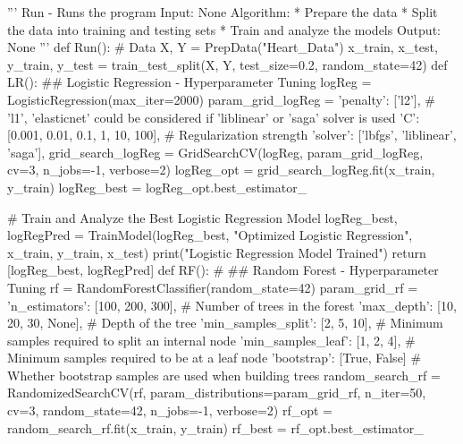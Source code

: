 {\begin{highlight}[Assets]
    \begin{code}[Python]
    ''' Run - Runs the program
            Input:
                None
            Algorithm:
                * Prepare the data
                * Split the data into training and testing sets
                * Train and analyze the models
            Output:
                None
    '''
    def Run():
        # Data
        X, Y = PrepData("Heart_Data")
        x_train, x_test, y_train, y_test = train_test_split(X, Y, test_size=0.2, random_state=42)
        def LR():
            ## Logistic Regression - Hyperparameter Tuning
            logReg = LogisticRegression(max_iter=2000)
            param_grid_logReg = {
                'penalty': ['l2'],  # 'l1', 'elasticnet' could be considered if 'liblinear' or 'saga' solver is used
                'C': [0.001, 0.01, 0.1, 1, 10, 100],  # Regularization strength
                'solver': ['lbfgs', 'liblinear', 'saga'],
            }
            grid_search_logReg = GridSearchCV(logReg, param_grid_logReg, cv=3, n_jobs=-1, verbose=2)
            logReg_opt = grid_search_logReg.fit(x_train, y_train)
            logReg_best = logReg_opt.best_estimator_

            # Train and Analyze the Best Logistic Regression Model
            logReg_best, logRegPred = TrainModel(logReg_best, "Optimized Logistic Regression", x_train, y_train, x_test)
            print("Logistic Regression Model Trained")
            return [logReg_best, logRegPred]
        def RF():
            # ## Random Forest - Hyperparameter Tuning
            rf = RandomForestClassifier(random_state=42)
            param_grid_rf = {
                'n_estimators': [100, 200, 300],               # Number of trees in the forest
                'max_depth': [10, 20, 30, None],               # Depth of the tree
                'min_samples_split': [2, 5, 10],               # Minimum samples required to split an internal node
                'min_samples_leaf': [1, 2, 4],                 # Minimum samples required to be at a leaf node
                'bootstrap': [True, False]                     # Whether bootstrap samples are used when building trees
            }
            random_search_rf = RandomizedSearchCV(rf, param_distributions=param_grid_rf, n_iter=50, cv=3, random_state=42, n_jobs=-1, verbose=2)
            rf_opt = random_search_rf.fit(x_train, y_train)
            rf_best = rf_opt.best_estimator_


\end{code}
\end{highlight}}

